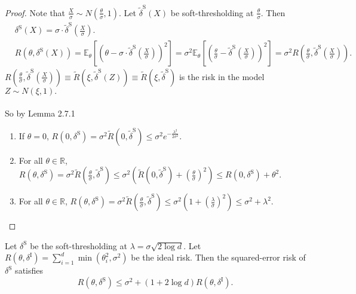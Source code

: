 \documentclass[a4paper]{article}
\begin{document}
\begin{proof}
	Note that $\frac{X}{\sigma} \sim N(\frac{\theta}{\sigma},1)$. Let $\tilde{\delta}^{\text{S}}(X)$ be soft-thresholding at $\frac{\theta}{\sigma}$. Then
	\begin{equation*}
		\begin{aligned}
			& \delta^{\text{S}}(X) = \sigma \cdot \tilde{\delta}^{\text{S}}(\frac{X}{\sigma}). \\
			& R(\theta,\delta^{\text{S}}(X)) = \mathbb{E}_\theta\left[\left(\theta - \sigma \cdot \tilde{\delta}^{\text{S}}\left(\frac{X}{\sigma}\right)\right)^2\right] = \sigma^2 \mathbb{E}_\theta\left[\left(\frac{\theta}{\sigma} - \tilde{\delta}^{\text{S}}\left(\frac{X}{\sigma}\right)\right)^2\right] = \sigma^2 R\left(\frac{\theta}{\sigma},\tilde{\delta}^{\text{S}}\left(\frac{X}{\sigma}\right)\right).
		\end{aligned}
	\end{equation*}
	$R\left(\frac{\theta}{\sigma},\tilde{\delta}^{\text{S}}\left(\frac{X}{\sigma}\right)\right) \equiv \tilde{R}(\xi,\tilde{\delta}^{\text{S}}(Z)) \equiv \tilde{R}(\xi,\tilde{\delta}^{\text{S}})$ is the risk in the model $Z \sim N(\xi,1).$ \\ \\
	So by Lemma 2.7.1
	\begin{enumerate}
		\item If $\theta = 0$, $R(0,\delta^{\text{S}}) = \sigma^2 \tilde{R}(0,\tilde{\delta}^{\text{S}}) \leq \sigma^2e^{-\frac{\lambda^2}{2\sigma^2}}$.
		\item For all $\theta \in \mathbb{R}$, $R(\theta,\delta^{\text{S}}) = \sigma^2 \tilde{R}(\frac{\theta}{\sigma},\tilde{\delta}^{\text{S}}) \leq \sigma^2(\tilde{R}(0,\tilde{\delta}^{\text{S}}) + (\frac{\theta}{\sigma})^2) \leq R(0,\delta^{\text{S}}) + \theta^2$.
		\item For all $\theta \in \mathbb{R}$, $R(\theta,\delta^{\text{S}}) = \sigma^2 \tilde{R}(\frac{\theta}{\sigma},\tilde{\delta}^{\text{S}}) \leq \sigma^2(1 + (\frac{\lambda}{\sigma})^2) \leq \sigma^2 + \lambda^2$.
	\end{enumerate}
\end{proof}

\begin{thm}
	Let $\delta^{\text{S}}$ be the soft-thresholding at $\lambda = \sigma\sqrt{2\log d}$. Let $R(\theta,\delta^{\text{I}}) = \sum\limits_{i=1}^d \min(\theta_i^2,\sigma^2)$ be the ideal risk. Then the squared-error risk of $\delta^{\text{S}}$ satisfies
	\begin{equation}
		R(\theta,\delta^{\text{S}}) \leq \sigma^2 + (1 + 2\log d)R(\theta,\delta^{\text{I}}).
	\end{equation}
\end{thm}
\end{document}
